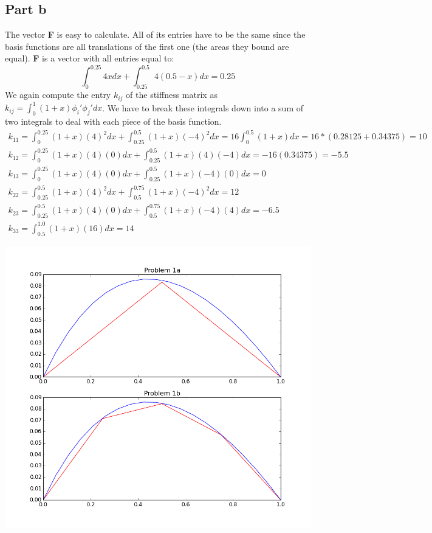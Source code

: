 \documentclass[10pt]{article}
\newcommand{\tbf}[1]{\textbf{#1}}
\newcommand{\iab}[2]{\int_{ #1 }^{ #2 }}
\begin{document}
\subsection*{Part b}
The vector \tbf{F} is easy to calculate. All of its entries have to be the same since the basis functions are all translations of the first one (the areas they bound are equal). \tbf{F} is a vector with all entries equal to:
\begin{equation*}
\iab{0}{0.25}4xdx + \iab{0.25}{0.5}4(0.5-x)dx = 0.25
\end{equation*}
We again compute the entry $k_{ij}$ of the stiffness matrix as $k_{ij} = \int_0^1(1+x)\phi_i'\phi_j'dx$. We have to break these integrals down into a sum of two integrals to deal with each piece of the basis function. 
\begin{gather*}
k_{11} = \int_0^{0.25}(1+x)(4)^2dx+\iab{0.25}{0.5}(1+x)(-4)^2dx = 16\iab{0}{0.5}(1+x)dx = 16*(0.28125 + 0.34375) = 10\\
k_{12} = \iab{0}{0.25}(1+x)(4)(0)dx + \iab{0.25}{0.5}(1+x)(4)(-4)dx = -16(0.34375) = -5.5\\
k_{13} = \iab{0}{0.25}(1+x)(4)(0)dx + \iab{0.25}{0.5}(1+x)(-4)(0)dx = 0\\
k_{22} = \iab{0.25}{0.5}(1+x)(4)^2dx + \iab{0.5}{0.75}(1+x)(-4)^2dx = 12\\
k_{23} = \iab{0.25}{0.5}(1+x)(4)(0)dx +\iab{0.5}{0.75}(1+x)(-4)(4)dx = -6.5\\
k_{33} = \iab{0.5}{1.0}(1+x)(16)dx = 14
\end{gather*}
\begin{center}
\includegraphics[scale = 0.5]{prob1.png}
\end{center}
\end{document}
